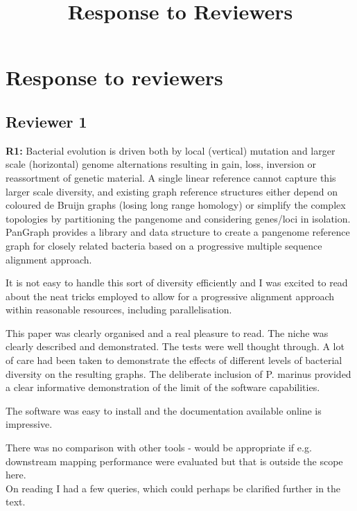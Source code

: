 \documentclass[aps,rmp,onecolumn]{revtex4-1}
\title{Response to Reviewers}
\newcommand{\reviewer}[2]{\textbf{#1:} #2\vskip 5mm}
\begin{document}
\maketitle

\section*{Response to reviewers}

\subsection*{Reviewer 1}

\reviewer{R1}{Bacterial evolution is driven both by local (vertical) mutation and larger scale (horizontal) genome alternations resulting in gain, loss, inversion or reassortment of genetic material. A single linear reference cannot capture this larger scale diversity, and existing graph reference structures either depend on coloured de Bruijn graphs (losing long range homology) or simplify the complex topologies by partitioning the pangenome and considering genes/loci in isolation. PanGraph provides a library and data structure to create a pangenome reference graph for closely related bacteria based on a progressive multiple sequence alignment approach.

      It is not easy to handle this sort of diversity efficiently and I was excited to read about the neat tricks employed to allow for a progressive alignment approach within reasonable resources, including parallelisation.

      This paper was clearly organised and a real pleasure to read. The niche was clearly described and demonstrated. The tests were well thought through. A lot of care had been taken to demonstrate the effects of different levels of bacterial diversity on the resulting graphs. The deliberate inclusion of P. marinus provided a clear informative demonstration of the limit of the software capabilities.

      The software was easy to install and the documentation available online is impressive.

      There was no comparison with other tools - would be appropriate if e.g. downstream mapping performance were evaluated but that is outside the scope here.\\

      On reading I had a few queries, which could perhaps be clarified further in the text.}
\end{document}
